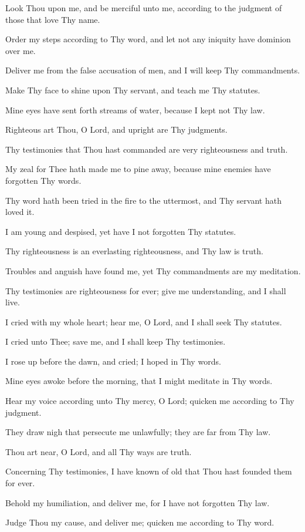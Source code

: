 Look Thou upon me, and be merciful unto me, according to the judgment of those that love Thy name.

Order my steps according to Thy word, and let not any iniquity have dominion over me.

Deliver me from the false accusation of men, and I will keep Thy commandments.

Make Thy face to shine upon Thy servant, and teach me Thy statutes.

Mine eyes have sent forth streams of water, because I kept not Thy law.

Righteous art Thou, O Lord, and upright are Thy judgments.

Thy testimonies that Thou hast commanded are very righteousness and truth.

My zeal for Thee hath made me to pine away, because mine enemies have forgotten Thy words.

Thy word hath been tried in the fire to the uttermost, and Thy servant hath loved it.

I am young and despised, yet have I not forgotten Thy statutes.

Thy righteousness is an everlasting righteousness, and Thy law is truth.

Troubles and anguish have found me, yet Thy commandments are my meditation.

Thy testimonies are righteousness for ever; give me understanding, and I shall live.

I cried with my whole heart; hear me, O Lord, and I shall seek Thy statutes.

I cried unto Thee; save me, and I shall keep Thy testimonies.

I rose up before the dawn, and cried; I hoped in Thy words.

Mine eyes awoke before the morning, that I might meditate in Thy words.

Hear my voice according unto Thy mercy, O Lord; quicken me according to Thy judgment.

They draw nigh that persecute me unlawfully; they are far from Thy law.

Thou art near, O Lord, and all Thy ways are truth.

Concerning Thy testimonies, I have known of old that Thou hast founded them for ever.

Behold my humiliation, and deliver me, for I have not forgotten Thy law.

Judge Thou my cause, and deliver me; quicken me according to Thy word.

